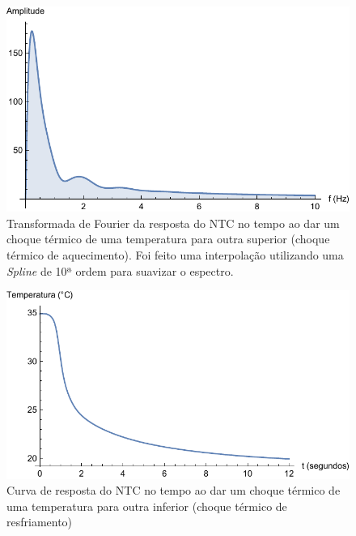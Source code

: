\documentclass[a4paper]{instrumentacao}
\begin{document}
\begin{figure}[H]
\center
\includegraphics[width=\textwidth]{ThermalShock-Up-Frequency.pdf}
\caption{Transformada de Fourier da resposta do NTC no tempo ao dar um choque térmico de uma temperatura para outra superior (choque térmico de aquecimento). Foi feito uma interpolação utilizando uma \textit{Spline} de 10ª ordem para suavizar o espectro.}
\label{fig:ntc-choque-acima-frequencia}
\end{figure}


\begin{figure}[H]
\center
\includegraphics[width=\textwidth]{ThermalShock-Down-Time.pdf}
\caption{Curva de resposta do NTC no tempo ao dar um choque térmico de uma temperatura para outra inferior (choque térmico de resfriamento)}
\label{fig:ntc-choque-abaixo-tempo}
\end{figure}
\end{document}
